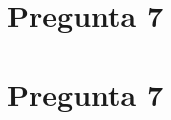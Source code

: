 \documentclass[11pt,oneside]{article}
\begin{document}
	\section*{Pregunta 7}
	\section*{Pregunta 7}
	
	
	
	
	
	
	
\end{document}
